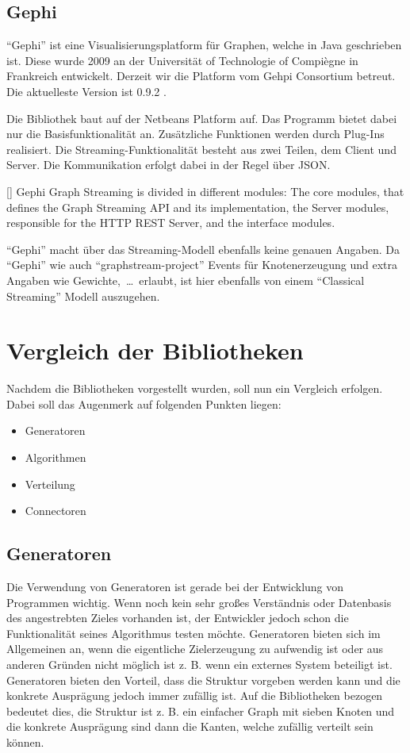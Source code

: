 \subsection{Gephi}
\enquote{Gephi} ist eine Visualisierungsplatform für Graphen, welche in Java
geschrieben ist. Diese wurde 2009 an der Universität of Technologie of Compiègne
in Frankreich entwickelt. Derzeit wir die Platform vom Gehpi Consortium betreut.
Die aktuelleste Version ist 0.9.2 .

Die Bibliothek baut auf der Netbeans Platform auf. Das Programm bietet dabei nur
die Basisfunktionalität an. Zusätzliche Funktionen werden durch Plug-Ins
realisiert. Die Streaming-Funktionalität besteht aus zwei Teilen, dem Client und
Server. Die Kommunikation erfolgt dabei in der Regel über \gls{JSON}.

[\cite{Bastian2009}]{
Gephi Graph Streaming is divided in different modules: The core modules, that
defines the Graph Streaming API and its implementation, the Server modules,
responsible for the HTTP REST Server, and the interface modules. 
}

\enquote{Gephi} macht über das Streaming-Modell ebenfalls keine genauen Angaben.
Da \enquote{Gephi} wie auch \enquote{graphstream-project} Events für
Knotenerzeugung und extra Angaben wie Gewichte,~\dots~erlaubt, ist hier
ebenfalls von einem \enquote{Classical Streaming} Modell auszugehen.

\section{Vergleich der Bibliotheken}
Nachdem die Bibliotheken vorgestellt wurden, soll nun ein Vergleich erfolgen.
Dabei soll das Augenmerk auf folgenden Punkten liegen:

\begin{itemize}
\item Generatoren
\item Algorithmen
\item Verteilung
\item Connectoren
\end{itemize}

\subsection{Generatoren}
Die Verwendung von Generatoren ist gerade bei der Entwicklung von Programmen
wichtig. Wenn noch kein sehr großes Verständnis oder Datenbasis des angestrebten
Zieles vorhanden ist, der Entwickler jedoch schon die Funktionalität seines
Algorithmus testen möchte. Generatoren bieten sich im Allgemeinen an, wenn die
eigentliche Zielerzeugung zu aufwendig ist oder aus anderen Gründen nicht möglich
ist z. B. wenn ein externes System beteiligt ist. Generatoren bieten den
Vorteil, dass die Struktur vorgeben werden kann und die konkrete Ausprägung jedoch
immer zufällig ist. Auf die Bibliotheken bezogen bedeutet dies, die Struktur ist
z. B. ein einfacher Graph mit sieben Knoten und die konkrete Ausprägung sind dann
die Kanten, welche zufällig verteilt sein können.

